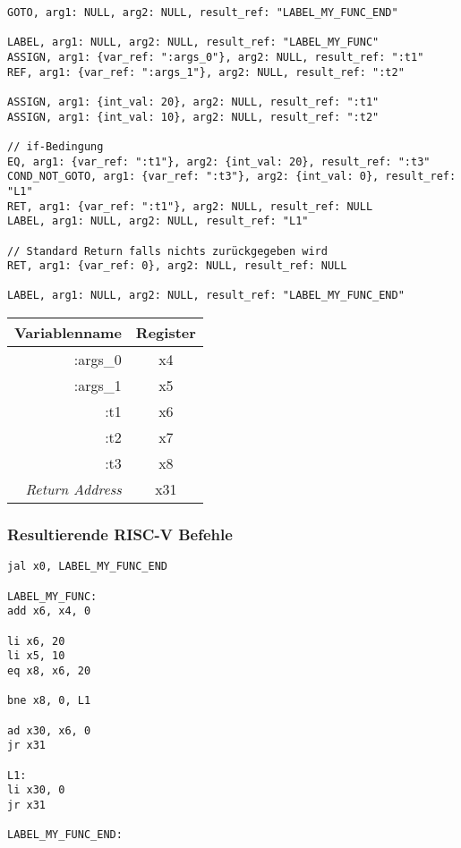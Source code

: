 \begin{lstlisting}[caption={Drei-Adressen Code Funktionsdeklaration}]
GOTO, arg1: NULL, arg2: NULL, result_ref: "LABEL_MY_FUNC_END"

LABEL, arg1: NULL, arg2: NULL, result_ref: "LABEL_MY_FUNC"
ASSIGN, arg1: {var_ref: ":args_0"}, arg2: NULL, result_ref: ":t1"
REF, arg1: {var_ref: ":args_1"}, arg2: NULL, result_ref: ":t2"

ASSIGN, arg1: {int_val: 20}, arg2: NULL, result_ref: ":t1"
ASSIGN, arg1: {int_val: 10}, arg2: NULL, result_ref: ":t2"

// if-Bedingung
EQ, arg1: {var_ref: ":t1"}, arg2: {int_val: 20}, result_ref: ":t3"
COND_NOT_GOTO, arg1: {var_ref: ":t3"}, arg2: {int_val: 0}, result_ref: "L1"
RET, arg1: {var_ref: ":t1"}, arg2: NULL, result_ref: NULL
LABEL, arg1: NULL, arg2: NULL, result_ref: "L1"

// Standard Return falls nichts zurückgegeben wird
RET, arg1: {var_ref: 0}, arg2: NULL, result_ref: NULL

LABEL, arg1: NULL, arg2: NULL, result_ref: "LABEL_MY_FUNC_END"
\end{lstlisting}

\begin{table}[H]
  \begin{center}
    \begin{tabular}{| r | c |}
      \hline
      Variablenname & Register \\
      \hline
      :args\_0 & x4 \\
      :args\_1 & x5 \\
      :t1 & x6 \\
      :t2 & x7 \\
      :t3 & x8 \\
      \textit{Return Address} & x31 \\
      \hline
    \end{tabular}
  \end{center}
\end{table}

\subsubsection{Resultierende RISC-V Befehle}

\begin{lstlisting}
jal x0, LABEL_MY_FUNC_END

LABEL_MY_FUNC:
add x6, x4, 0

li x6, 20
li x5, 10
eq x8, x6, 20

bne x8, 0, L1

ad x30, x6, 0
jr x31

L1:
li x30, 0
jr x31

LABEL_MY_FUNC_END:
\end{lstlisting}
